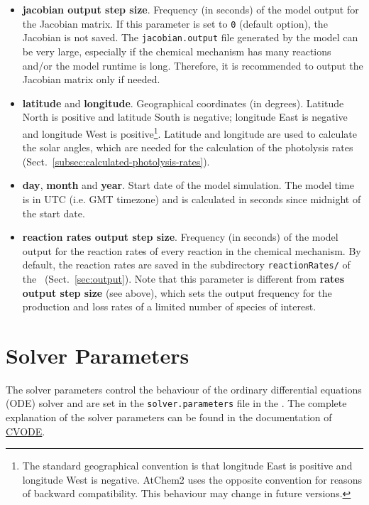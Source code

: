 \begin{itemize}
  constrained data -- go to Sect.~\ref{subsec:interpolation} for more information.
\item \textbf{jacobian output step size}. Frequency (in seconds) of the model output for the
  Jacobian matrix. If this parameter is set to \texttt{0} (default option), the Jacobian is not
  saved. The \texttt{jacobian.output} file generated by the model can be very large, especially
  if the chemical mechanism has many reactions and/or the model runtime is long. Therefore, it
  is recommended to output the Jacobian matrix only if needed.
\item \textbf{latitude} and \textbf{longitude}. Geographical coordinates (in degrees). Latitude
  North is positive and latitude South is negative; longitude East is negative and longitude
  West is positive\footnote{The standard geographical convention is that longitude East is
    positive and longitude West is negative. AtChem2 uses the opposite convention for reasons
    of backward compatibility. This behaviour may change in future versions.}. Latitude and
  longitude are used to calculate the solar angles, which are needed for the calculation of the
  photolysis rates (Sect.~\ref{subsec:calculated-photolysis-rates}).
\item \textbf{day}, \textbf{month} and \textbf{year}. Start date of the model simulation. The
  model time is in UTC (i.e. GMT timezone) and is calculated in seconds since midnight of the
  start date.
\item \textbf{reaction rates output step size}. Frequency (in seconds) of the model output for
  the reaction rates of every reaction in the chemical mechanism. By default, the reaction
  rates are saved in the subdirectory \texttt{reactionRates/} of the \outdir\
  (Sect.~\ref{sec:output}). Note that this parameter is different from \textbf{rates output
    step size} (see above), which sets the output frequency for the production and loss rates
  of a limited number of species of interest.
\end{itemize}

\section{Solver Parameters} \label{sec:solver-parameters}

The solver parameters control the behaviour of the ordinary differential equations (ODE) solver
and are set in the \texttt{solver.parameters} file in the \configdir. The complete explanation
of the solver parameters can be found in the documentation of
\href{https://computing.llnl.gov/projects/sundials/cvode}{CVODE}.

